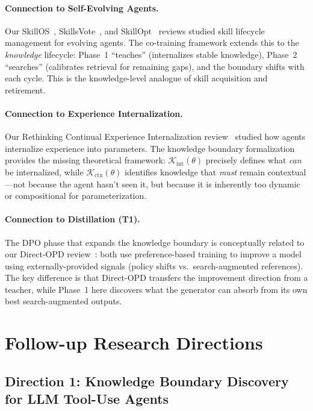 \documentclass[11pt,a4paper]{article}
\begin{document}
\paragraph{Connection to Self-Evolving Agents.} Our SkillOS~\cite{skillos2026}, SkillsVote~\cite{skillsvote2026}, and SkillOpt~\cite{skillopt2026} reviews studied skill lifecycle management for evolving agents. The co-training framework extends this to the \emph{knowledge} lifecycle: Phase~1 ``teaches'' (internalizes stable knowledge), Phase~2 ``searches'' (calibrates retrieval for remaining gaps), and the boundary shifts with each cycle. This is the knowledge-level analogue of skill acquisition and retirement.

\paragraph{Connection to Experience Internalization.} Our Rethinking Continual Experience Internalization review~\cite{rethinking2026} studied how agents internalize experience into parameters. The knowledge boundary formalization provides the missing theoretical framework: $\mathcal{K}_{\mathrm{int}}(\theta)$ precisely defines what \emph{can} be internalized, while $\mathcal{K}_{\mathrm{ctx}}(\theta)$ identifies knowledge that \emph{must} remain contextual---not because the agent hasn't seen it, but because it is inherently too dynamic or compositional for parameterization.

\paragraph{Connection to Distillation (T1).} The DPO phase that expands the knowledge boundary is conceptually related to our Direct-OPD review~\cite{directopd2026}: both use preference-based training to improve a model using externally-provided signals (policy shifts vs.\ search-augmented references). The key difference is that Direct-OPD transfers the improvement direction from a teacher, while Phase~1 here discovers what the generator can absorb from its own best search-augmented outputs.

\section{Follow-up Research Directions}

\subsection{Direction 1: Knowledge Boundary Discovery for LLM Tool-Use Agents}
\end{document}
